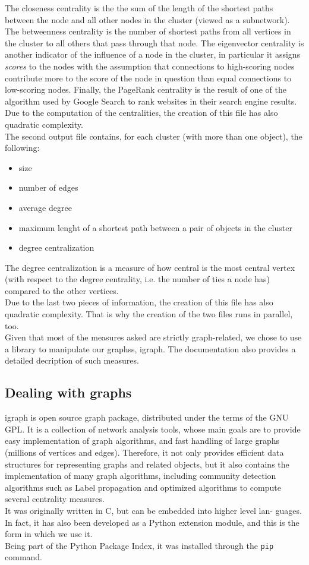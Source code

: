 \documentclass[a4paper,11pt]{book}
\begin{document}
The closeness centrality is the the sum of the length of the shortest paths between the node and all other nodes in the cluster (viewed as a subnetwork). The betweenness centrality is the number of shortest paths from all vertices in the cluster to all others that pass through that node. The eigenvector centrality is another indicator of the influence of a node in the cluster, in particular it assigns \textit{scores} to the nodes with the assumption that connections to high-scoring nodes contribute more to the score of the node in question than equal connections to low-scoring nodes. Finally, the PageRank centrality is the result of one of the algorithm used by Google Search to rank websites in their search engine results.\\
Due to the computation of the centralities, the creation of this file has also quadratic complexity.\\

The second output file contains, for each cluster (with more than one object), the following:
\begin{itemize}
\item size
\item number of edges
\item average degree
\item maximum lenght of a shortest path between a pair of objects in the cluster
\item degree centralization
\end{itemize}
The degree centralization is a measure of how central is the most central vertex (with respect to the degree centrality, i.e. the number of ties a node has) compared to the other vertices.\\
Due to the last two pieces of information, the creation of this file has also quadratic complexity. That is why the creation of the two files runs in parallel, too.\\
Given that most of the measures asked are strictly graph-related, we chose to use a library to manipulate our graphss, igraph\cite{igr}. The documentation also provides a detailed decription of such measures.
\subsection{Dealing with graphs} 
  igraph is open source graph package, distributed under the terms of the GNU GPL.
  It is a collection of network analysis tools, whose main goals are to provide easy implementation  of graph algorithms, and fast handling of large graphs (millions of vertices and edges).
  Therefore, it not only provides efficient data structures for representing graphs
  and related objects, but it also contains the implementation of many graph
  algorithms, including community detection algorithms such as Label propagation and optimized algorithms to compute several centrality measures.\\
  It was originally written in C, but can be embedded into higher level lan-
  guages. In fact, it has also been developed as a Python extension module,
  and this is the form in which we use it.\\
Being part of the Python Package Index, it was installed through the \lstinline!pip! command.
\end{document}
